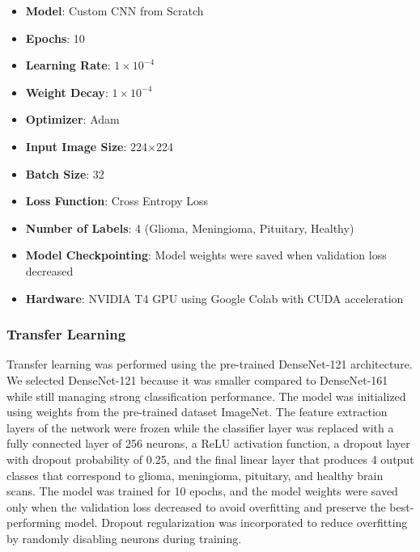\documentclass[conference]{IEEEtran}
\begin{document}
\begin{itemize}
    \item \textbf{Model}: Custom CNN from Scratch
    
    \item \textbf{Epochs}: 10

    \item \textbf{Learning Rate}: $1 \times 10^{-4}$

    \item \textbf{Weight Decay}: $1 \times 10^{-4}$
    
    \item \textbf{Optimizer}: Adam
    
    \item \textbf{Input Image Size}: 224$\times$224
    
    \item \textbf{Batch Size}: 32
    
    \item \textbf{Loss Function}: Cross Entropy Loss

    \item \textbf{Number of Labels}: 4 (Glioma, Meningioma, Pituitary, Healthy)
    
    \item \textbf{Model Checkpointing}: Model weights were saved when validation loss decreased
    
    \item \textbf{Hardware}: NVIDIA T4 GPU using Google Colab with CUDA acceleration
\end{itemize}

\subsubsection{Transfer Learning}
Transfer learning was performed using the pre-trained DenseNet-121 architecture. We selected DenseNet-121 because it was smaller compared to DenseNet-161 while still managing strong classification performance. The model was initialized using weights from the pre-trained dataset ImageNet. The feature extraction layers of the network were frozen while the classifier layer was replaced with a fully connected layer of 256 neurons, a ReLU activation function, a dropout layer with dropout probability of 0.25, and the final linear layer that produces 4 output classes that correspond to glioma, meningioma, pituitary, and healthy brain scans. The model was trained for 10 epochs, and the model weights were saved only when the validation loss decreased to avoid overfitting and preserve the best-performing model. Dropout regularization was incorporated to reduce overfitting by randomly disabling neurons during training. 
\vspace{0.5cm}
\end{document}
